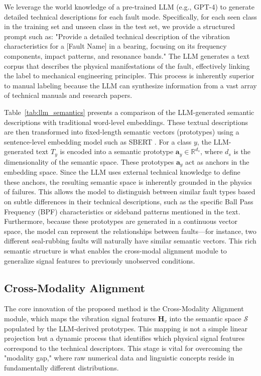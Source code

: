 We leverage the world knowledge of a pre-trained LLM (e.g., GPT-4) to generate detailed technical descriptions for each fault mode. Specifically, for each seen class in the training set and unseen class in the test set, we provide a structured prompt such as: "Provide a detailed technical description of the vibration characteristics for a [Fault Name] in a bearing, focusing on its frequency components, impact patterns, and resonance bands." The LLM generates a text corpus that describes the physical manifestations of the fault, effectively linking the label to mechanical engineering principles. This process is inherently superior to manual labeling because the LLM can synthesize information from a vast array of technical manuals and research papers.

Table~\ref{tab:llm_semantics} presents a comparison of the LLM-generated semantic descriptions with traditional word-level embeddings. These textual descriptions are then transformed into fixed-length semantic vectors (prototypes) using a sentence-level embedding model such as SBERT \cite{reimers2019sentence}. For a class $y$, the LLM-generated text $T_y$ is encoded into a semantic prototype $\mathbf{a}_y \in \mathbb{R}^{d_s}$, where $d_s$ is the dimensionality of the semantic space. These prototypes $\mathbf{a}_y$ act as anchors in the embedding space. Since the LLM uses external technical knowledge to define these anchors, the resulting semantic space is inherently grounded in the physics of failures. This allows the model to distinguish between similar fault types based on subtle differences in their technical descriptions, such as the specific Ball Pass Frequency (BPF) characteristics or sideband patterns mentioned in the text. Furthermore, because these prototypes are generated in a continuous vector space, the model can represent the relationships between faults—for instance, two different seal-rubbing faults will naturally have similar semantic vectors. This rich semantic structure is what enables the cross-modal alignment module to generalize signal features to previously unobserved conditions.

\subsection{Cross-Modality Alignment}
The core innovation of the proposed method is the Cross-Modality Alignment module, which maps the vibration signal features $\mathbf{H}_v$ into the semantic space $\mathcal{S}$ populated by the LLM-derived prototypes. This mapping is not a simple linear projection but a dynamic process that identifies which physical signal features correspond to the technical descriptors. This stage is vital for overcoming the "modality gap," where raw numerical data and linguistic concepts reside in fundamentally different distributions.

